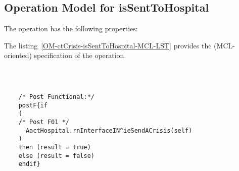 \subsection{Operation Model for isSentToHospital}

\label{OM-isSentToHospital}


The  operation has the following properties:

	\begin{operationmodel}



		


	\end{operationmodel}



	\vspace{1cm}
	The listing~\ref{OM-ctCrisis-isSentToHospital-MCL-LST} provides the \msrmessir (MCL-oriented) specification of the operation.
	
	\scriptsize
	\vspace{0.5cm}
	\begin{lstlisting}[style=MessirStyle,firstnumber=auto,captionpos=b,caption={\msrmessir (MCL-oriented) specification of the operation \emph{isSentToHospital}.},label=OM-ctCrisis-isSentToHospital-MCL-LST]

	
	
	/* Post Functional:*/ 
	postF{if 
	(
	/* Post F01 */
	  AactHospital.rnInterfaceIN^ieSendACrisis(self)
	)
	then (result = true)
	else (result = false)
	endif}
	
	
	\end{lstlisting}
	\normalsize 
	
	
	
	





